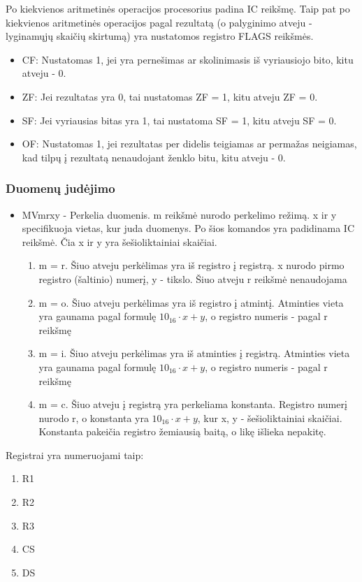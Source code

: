 \documentclass{VUMIFInfKursinis}
\begin{document}
Po kiekvienos aritmetinės operacijos procesorius padina IC reikšmę. Taip pat po kiekvienos aritmetinės operacijos pagal rezultatą (o palyginimo atveju - lyginamųjų skaičių skirtumą) yra nustatomos registro FLAGS reikšmės.

\begin{itemize}
	\item CF: Nustatomas 1, jei yra pernešimas ar skolinimasis iš vyriausiojo bito, kitu atveju - 0.
	\item ZF: Jei rezultatas yra 0, tai nustatomas ZF = 1, kitu atveju ZF = 0.
	\item SF: Jei vyriausias bitas yra 1, tai nustatoma SF = 1, kitu atveju SF = 0.
	\item OF: Nustatomas 1, jei rezultatas per didelis teigiamas ar permažas neigiamas, kad tilpų į rezultatą nenaudojant ženklo bitu, kitu atveju - 0.
\end{itemize}

\subsubsection{Duomenų judėjimo}
\begin{itemize}
	\item MVmrxy - Perkelia duomenis. m reikšmė nurodo perkelimo režimą. x ir y specifikuoja vietas, kur juda duomenys. Po šios komandos yra padidinama IC reikšmė. Čia x ir y yra šešioliktainiai skaičiai.
	\begin{enumerate}
		\item m = r. Šiuo atveju perkėlimas yra iš registro į registrą. x nurodo pirmo registro (šaltinio) numerį, y - tikslo. Šiuo atveju r reikšmė nenaudojama
		\item m = o. Šiuo atveju perkėlimas yra iš registro į atmintį. Atminties vieta yra gaunama pagal formulę $10_{16} \cdot x + y$, o registro numeris - pagal r reikšmę
		\item m = i. Šiuo atveju perkėlimas yra iš atminties į registrą. Atminties vieta yra gaunama pagal formulę $10_{16} \cdot x + y$, o registro numeris - pagal r reikšmę
		\item m = c. Šiuo atveju į registrą yra perkeliama konstanta. Registro numerį nurodo r, o konstanta yra $10_{16} \cdot x + y$, kur x, y - šešioliktainiai skaičiai. Konstanta pakeičia registro žemiausią baitą, o likę išlieka nepakitę.
	\end{enumerate}
\end{itemize}


Registrai yra numeruojami taip:
\begin{enumerate}
	\item R1
	\item R2
	\item R3
	\item CS
	\item DS
\end{enumerate}
\end{document}
